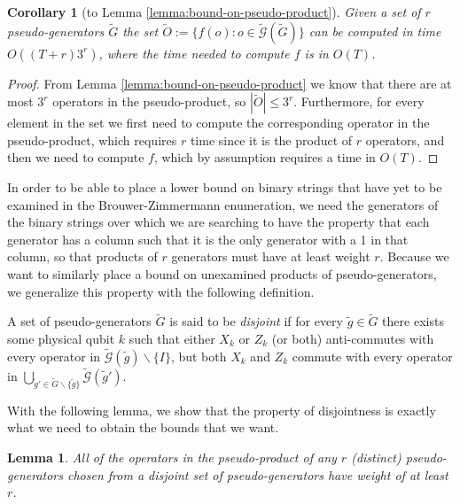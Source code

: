\documentclass[twocolumn,showpacs,preprintnumbers,amsmath,amssymb,nofootinbib,pra,floatfix]{revtex4-1}
\newtheorem{lemma}{Lemma}
\newtheorem{corollary}{Corollary}
\newenvironment{definition}[1][Definition]{\begin{trivlist}
\item[\hskip \labelsep {\bfseries #1}]}{\end{trivlist}}
\newenvironment{remark}[1][Remark]{\begin{trivlist}
\item[\hskip \labelsep {\bfseries #1}]}{\end{trivlist}}
\newcommand{\set}{\tilde}
\newcommand{\genfun}{\tilde{\mathcal{G}}}
\begin{document}
\begin{corollary}[to Lemma \ref{lemma:bound-on-pseudo-product}]
\label{corolary:bound-on-pseudo-product}
Given a set of $r$ pseudo-generators $\set G$ the set $\set O:=\{f(o):o\in\genfun(\set G)\}$ can be computed in time $O((T+r) 3^r)$, where the time needed to compute $f$ is in $O(T)$.
\end{corollary}

\begin{proof}
From Lemma \ref{lemma:bound-on-pseudo-product} we know that there are at most $3^r$ operators in the pseudo-product, so $|\set O|\le 3^r$.  Furthermore, for every element in the set we first need to compute the corresponding operator in the pseudo-product, which requires $r$ time since it is the product of $r$ operators, and then we need to compute $f$, which by assumption requires a time in $O(T)$.
\end{proof}
\begin{remark}
In order to be able to place a lower bound on binary strings that have yet to be examined in the Brouwer-Zimmermann enumeration, we need the generators of the binary strings over which we are searching to have the property that each generator has a column such that it is the only generator with a 1 in that column, so that products of $r$ generators must have at least weight $r$.  Because we want to similarly place a bound on unexamined products of pseudo-generators, we generalize this property with the following definition.
\end{remark}

\begin{definition}
\label{definition:disjoint-pseudo-generators}
A set of pseudo-generators $\set G$ is said to be \emph{disjoint} if for every $\set g\in\set G$ there exists some physical qubit $k$ such that either $X_k$ or $Z_k$ (or both) anti-commutes with every operator in $\genfun(\set g)\backslash\{I\}$, but both $X_k$ and $Z_k$ commute with every operator in $\bigcup_{\set g'\in\set G\backslash\{\set g\}}\genfun(\set g')$.
\end{definition}

\begin{remark}
With the following lemma, we show that the property of disjointness is exactly what we need to obtain the bounds that we want.
\end{remark}

\begin{lemma}
\label{lemma:disjoint-pseudo-generators-bound}
All of the operators in the pseudo-product of any $r$ (distinct) pseudo-generators chosen from a disjoint set of pseudo-generators have weight of at least $r$.
\end{lemma}
\end{document}
